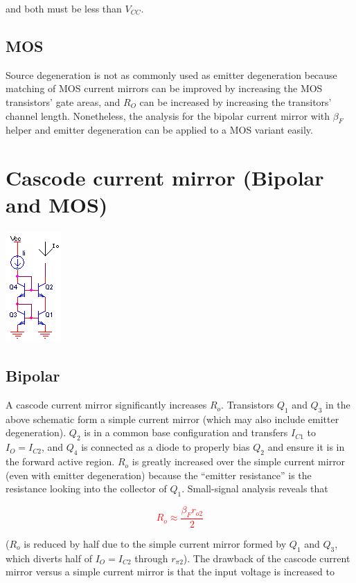 and both must be less than $V_{CC}$.
\subsection{MOS}
Source degeneration is not as commonly used as emitter degeneration because matching of MOS current mirrors can be improved by increasing the MOS transistors' gate areas, and $R_{O}$ can be increased by increasing the transitors' channel length.
Nonetheless, the analysis for the bipolar current mirror with $\beta_{F}$ helper and emitter degeneration can be applied to a MOS variant easily. \autocite[262-263]{analysis-design-analog-ics}

\section{Cascode current mirror (Bipolar and MOS)}
\begin{center}
	\includegraphics{schematics/cascodecurrentmirror.PNG}
\end{center}

\subsection{Bipolar}
A cascode current mirror significantly increases $R_{o}$.
Transistors $Q_1$ and $Q_3$ in the above schematic form a simple current mirror (which may also include emitter degeneration).
$Q_2$ is in a common base configuration and transfers $I_{C1}$ to $I_{O} = I_{C2}$, and $Q_4$ is connected as a diode to properly bias $Q_2$ and ensure it is in the forward active region.
$R_{o}$ is greatly increased over the simple current mirror (even with emitter degeneration) because the ``emitter resistance'' is the resistance looking into the collector of $Q_1$.
Small-signal analysis reveals that

\textcolor{red}{
\begin{equation}
R_{o} \approx \frac{\beta_{F} r_{o2}}{2}
\end{equation}
}

($R_{o}$ is reduced by half due to the simple current mirror formed by $Q_1$ and $Q_3$, which diverts half of $I_{O} = I_{C2}$ through $r_{\pi 2}$). \autocite[264]{analysis-design-analog-ics}
The drawback of the cascode current mirror versus a simple current mirror is that the input voltage is increased to

